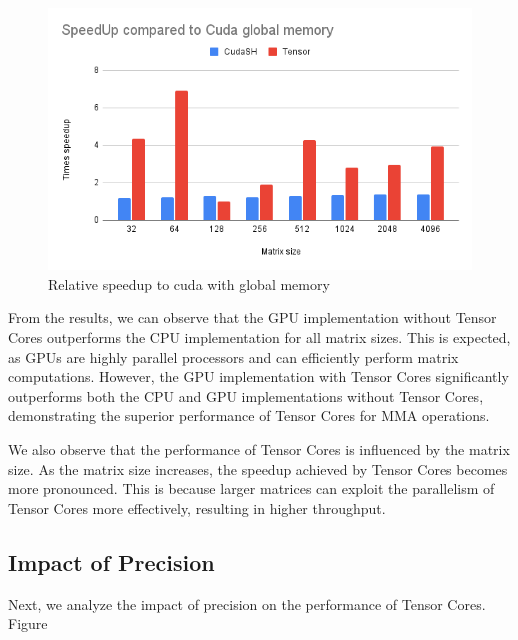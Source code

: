 \documentclass[conference]{IEEEtran}
\begin{document}
  \begin{figure}[htbp]
    \centering
    \includegraphics[scale=0.38]{figures/SpeedUp compared to Cuda global memory.png}
    \caption{Relative speedup to cuda with global memory}
    \label{fig:performance-comparison}
  \end{figure}
  
  From the results, we can observe that the GPU implementation without Tensor Cores outperforms the CPU implementation for all matrix sizes. This is expected, as GPUs are highly parallel processors and can efficiently perform matrix computations. However, the GPU implementation with Tensor Cores significantly outperforms both the CPU and GPU implementations without Tensor Cores, demonstrating the superior performance of Tensor Cores for MMA operations.
  
  We also observe that the performance of Tensor Cores is influenced by the matrix size. As the matrix size increases, the speedup achieved by Tensor Cores becomes more pronounced. This is because larger matrices can exploit the parallelism of Tensor Cores more effectively, resulting in higher throughput.
  
  \subsection{Impact of Precision}\label{sec:impact-precision}
  

  Next, we analyze the impact of precision on the performance of Tensor Cores. Figure %
  
  \begin{figure}[htbp]
  \end{figure}
  
\end{document}
